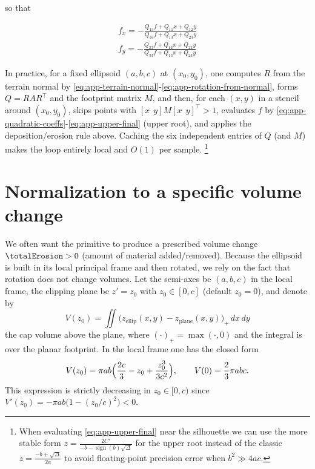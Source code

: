 so that

\begin{align}
    \label{eq:app-fx}
    f_x = -\frac{Q_{13}f + Q_{11}x + Q_{12}y}{Q_{33}f + Q_{13}x + Q_{23}y} \\
    \label{eq:app-fy}
    f_y = -\frac{Q_{23}f + Q_{12}x + Q_{22}y}{Q_{33}f + Q_{13}x + Q_{23}y}
\end{align}

In practice, for a fixed ellipsoid $(a,b,c)$ at $(x_0,y_0)$, one computes $R$ from the terrain normal by \cref{eq:app-terrain-normal}-\cref{eq:app-rotation-from-normal}, forms $Q=RAR^\top $ and the footprint matrix $M$, and then, for each $(x,y)$ in a stencil around $(x_0,y_0)$, skips points with $[x\ \ y] M [x\ \ y]^\top >1$, evaluates $f$ by \cref{eq:app-quadratic-coeffs}-\cref{eq:app-upper-final} (upper root), and applies the deposition/erosion rule above. Caching the six independent entries of $Q$ (and $M$) makes the loop entirely local and $O(1)$ per sample. 
\footnote{When evaluating \cref{eq:app-upper-final} near the silhouette we can use the more stable form
$z=\frac{2C'}{-b - \operatorname{sign}(b)\sqrt{\Delta}}$
for the upper root instead of the classic 
$z=\frac{-b + \sqrt{\Delta}}{2a}$ 
to avoid floating-point precision error when $b^2 \gg 4ac$.}



\section*{Normalization to a specific volume change}

We often want the primitive to produce a prescribed volume change $\totalErosion>0$ (amount of material added/removed). Because the ellipsoid is built in its local principal frame and then rotated, we rely on the fact that rotation does not change volumes. Let the semi-axes be $(a,b,c)$ in the local frame, the clipping plane be $z'=z_0$ with $z_0\in[0,c]$ (default $z_0=0$), and denote by
\[
V(z_0)=\iint \bigl(z_{\text{ellip}}(x,y)-z_{\text{plane}}(x,y)\bigr)_+\,dx\,dy
\]
the cap volume above the plane, where $(\cdot)_+=\max(\cdot,0)$ and the integral is over the planar footprint. In the local frame one has the closed form
\begin{align}
    \label{eq:app-cap-volume}
    V(z_0)=\pi a b\Bigl(\frac{2c}{3}-z_0+\frac{z_0^3}{3c^2}\Bigr),\qquad V(0)=\frac{2}{3}\pi a b c.
\end{align}
This expression is strictly decreasing in $z_0\in[0,c)$ since $V'(z_0)=-\pi a b\bigl(1-(z_0/c)^2\bigr)<0$.

